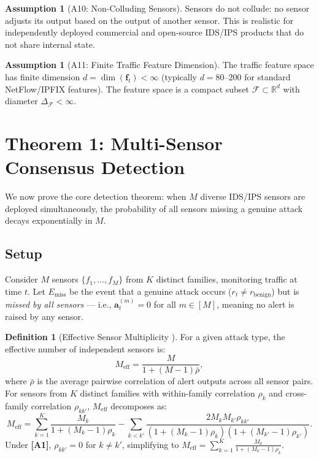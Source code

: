 \documentclass[11pt,a4paper]{article}
\theoremstyle{definition}
\newtheorem{definition}[theorem]{Definition}
\newtheorem{assumption}[theorem]{Assumption}
\theoremstyle{remark}
\newcommand{\assumptionTag}[1]{\textsf{\textbf{[A#1]}}}
\newcommand{\R}{\mathbb{R}}
\newcommand{\cF}{\mathcal{F}}
\newcommand{\alertvec}{\mathbf{a}}
\newcommand{\flowvec}{\mathbf{f}}
\begin{document}
\begin{assumption}[A10: Non-Colluding Sensors]
\label{ass:A10}
Sensors do not collude: no sensor adjusts its output based on the output of another sensor. This is realistic for independently deployed commercial and open-source IDS/IPS products that do not share internal state.
\end{assumption}

\begin{assumption}[A11: Finite Traffic Feature Dimension]
\label{ass:A11}
The traffic feature space has finite dimension $d = \dim(\flowvec_t) < \infty$ (typically $d = 80$--$200$ for standard NetFlow/IPFIX features). The feature space is a compact subset $\cF \subset \R^d$ with diameter $\Delta_{\mathcal{F}} < \infty$.
\end{assumption}

\section{Theorem 1: Multi-Sensor Consensus Detection }
\label{sec:theorem1}

We now prove the core detection theorem: when $M$ diverse IDS/IPS sensors are deployed simultaneously, the probability of all sensors missing a genuine attack decays exponentially in $M$.

\subsection{Setup}

Consider $M$ sensors $\{f_1, \ldots, f_M\}$ from $K$ distinct families, monitoring traffic at time $t$. Let $E_{\mathrm{miss}}$ be the event that a genuine attack occurs ($r_t \neq r_{\mathrm{benign}}$) but is \textit{missed by all sensors} — i.e., $\alertvec_t^{(m)} = 0$ for all $m \in [M]$, meaning no alert is raised by any sensor.

\begin{definition}[Effective Sensor Multiplicity ]
\label{def:Meff}
For a given attack type, the effective number of independent sensors is:
\begin{equation}
M_{\mathrm{eff}} = \frac{M}{1 + (M - 1) \bar{\rho}},
\label{eq:Meff}
\end{equation}
where $\bar{\rho}$ is the average pairwise correlation of alert outputs across all sensor pairs. For sensors from $K$ distinct families with within-family correlation $\rho_k$ and cross-family correlation $\rho_{kk'}$, $M_{\mathrm{eff}}$ decomposes as:
\begin{equation}
M_{\mathrm{eff}} = \sum_{k=1}^{K} \frac{M_k}{1 + (M_k - 1) \rho_k} - \sum_{k < k'} \frac{2 M_k M_{k'} \rho_{kk'}}{(1 + (M_k - 1) \rho_k)(1 + (M_{k'} - 1) \rho_{k'})}.
\label{eq:Meff_decomposed}
\end{equation}
Under \assumptionTag{1}, $\rho_{kk'} = 0$ for $k \neq k'$, simplifying to $M_{\mathrm{eff}} = \sum_{k=1}^{K} \frac{M_k}{1 + (M_k - 1) \rho_k}$.
\end{definition}
\end{document}
